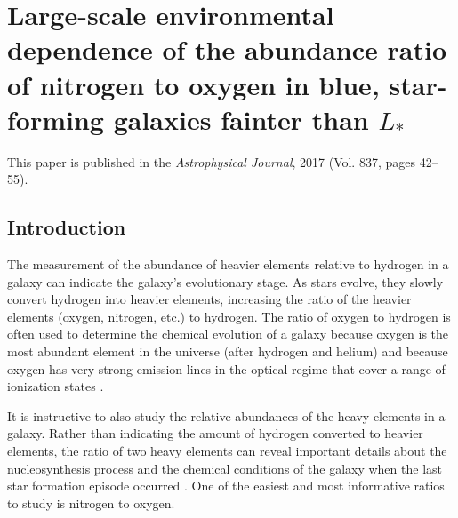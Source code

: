 \chapter[N/O ratio in dwarf galaxies]{Large-scale environmental dependence of the abundance ratio of nitrogen to oxygen in blue, star-forming galaxies fainter than $L_*$}


This paper is published in the \emph{Astrophysical Journal}, 2017 (Vol. 837, 
pages 42--55).


%
%
\section{Introduction}

The measurement of the abundance of heavier elements relative to hydrogen in a 
galaxy can indicate the galaxy's evolutionary stage.  As stars evolve, they 
slowly convert hydrogen into heavier elements, increasing the ratio of the 
heavier elements (oxygen, nitrogen, etc.) to hydrogen.  The ratio of oxygen to 
hydrogen is often used to determine the chemical evolution of a galaxy because 
oxygen is the most abundant element in the universe (after hydrogen and helium) 
and because oxygen has very strong emission lines in the optical regime that 
cover a range of ionization states \citep{Kewley02}.

It is instructive to also study the relative abundances of the heavy elements in 
a galaxy.  Rather than indicating the amount of hydrogen converted to heavier 
elements, the ratio of two heavy elements can reveal important details about the 
nucleosynthesis process and the chemical conditions of the galaxy when the last 
star formation episode occurred \citep{Izotov99}.  One of the easiest and most 
informative ratios to study is nitrogen to oxygen.

